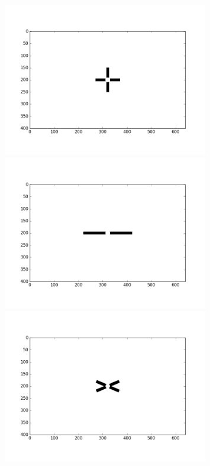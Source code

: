 \documentclass[11pt, a4paper]{article}
\begin{document}
\begin{figure}[ht]
\centering
	\begin{minipage}[b]{0.3\textwidth}
		\includegraphics[trim={2cm 2cm 2cm 2cm},clip,width=0.8\textwidth]{features/cross.png}
	\end{minipage}	
	\begin{minipage}[b]{0.3\textwidth}
		\includegraphics[trim={2cm 2cm 2cm 2cm},clip,width=0.8\textwidth]{features/line.png}
	\end{minipage}
	\begin{minipage}[b]{0.3\textwidth}
		\includegraphics[trim={2cm 2cm 2cm 2cm},clip,width=0.8\textwidth]{features/x.png}

\end{minipage}
\end{figure}
\end{document}
